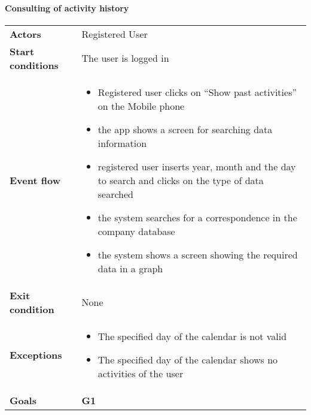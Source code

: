 \paragraph{Consulting of activity history}
\begin{center}
\begin{table}[H]
\centering
\begin{tabular}{l|l}
\textbf{Actors} & Registered User \\
\textbf{Start conditions} & The user is logged in \\
\textbf{Event flow}  & \begin{minipage}[t]{0.7\textwidth}
    \begin{itemize}
        \item Registered user clicks on “Show past activities” on the Mobile phone
        \item the app shows a screen for searching data information
        \item registered user inserts year, month and the day to search and clicks on the type of data searched
        \item  the system searches for a correspondence in the company database
        \item the system shows a screen showing the required data in a graph
    \end{itemize}
    
\end{minipage}\\ 
    
\textbf{Exit condition} & None \\
\textbf{Exceptions} &  \begin{minipage}[t]{0.7\textwidth}
    \begin{itemize}
        \item The specified day of the calendar is not valid

        \item The specified day of the calendar shows no activities of the user
    \end{itemize}
    
\end{minipage} \\
\textbf{Goals} & \textbf{G1}
\end{tabular}

\end{table}
\end{center}

